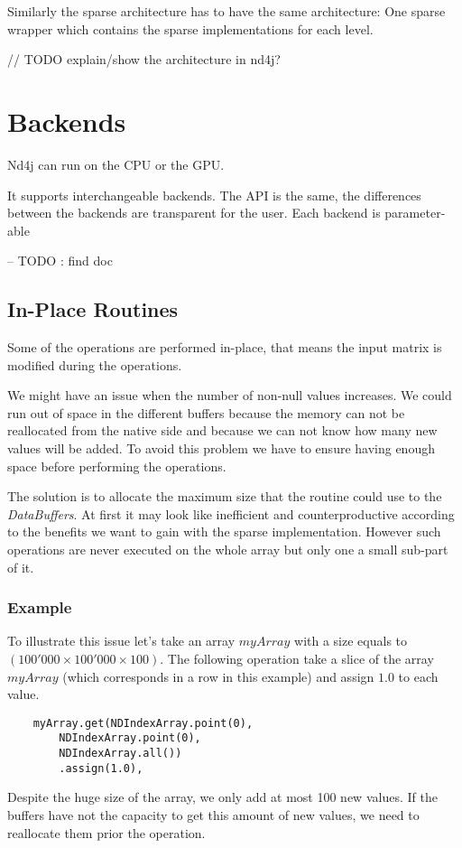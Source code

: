  Similarly the sparse architecture has to have the same architecture: One sparse wrapper which contains the sparse implementations for each level.
 
 // TODO explain/show the architecture in nd4j?
\section{Backends}

Nd4j can run on the CPU or the GPU. 

It supports interchangeable backends. The API is the same, the differences between the backends are transparent for the user.
Each backend is parameter-able 

-- TODO : find doc


\subsection{In-Place Routines}
Some of the operations are performed in-place, that means the input matrix is modified during the operations.

We might have an issue when the number of non-null values increases. We could run out of space in the different buffers because the memory can not be reallocated from the native side and because we can not know how many new values will be added. To avoid this problem we have to ensure having enough space before performing the operations.

The solution is to allocate the maximum size that the routine could use to the \textit{DataBuffers}. At first it may look like inefficient and counterproductive according to the benefits we want to gain with the sparse implementation. However such operations are never executed on the whole array but only one a small sub-part of it.

\subsubsection{Example}
To illustrate this issue let's take an array $myArray$ with a size equals to $(100'000\times 100'000 \times 100)$. 
The following operation take a slice of the array $myArray$ (which corresponds in a row in this example) and assign $1.0$ to each value. 
\begin{lstlisting}
	myArray.get(NDIndexArray.point(0), 
		NDIndexArray.point(0), 
		NDIndexArray.all())
		.assign(1.0),
\end{lstlisting}
Despite the huge size of the array, we only add at most 100 new values. If the buffers have not the capacity to get this amount of new values, we need to reallocate them prior the operation.


